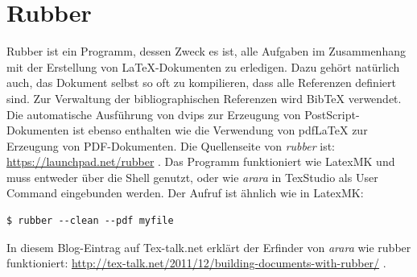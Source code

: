 \section{Rubber}
Rubber ist ein Programm, dessen Zweck es ist, alle Aufgaben im Zusammenhang mit der Erstellung von \LaTeX{}-Dokumenten zu erledigen. Dazu gehört natürlich auch, das Dokument selbst so oft zu kompilieren, dass alle Referenzen definiert sind. Zur Verwaltung der bibliographischen Referenzen wird BibTeX verwendet. Die automatische Ausführung von dvips zur Erzeugung von PostScript-Dokumenten ist ebenso enthalten wie die Verwendung von pdf\LaTeX{} zur Erzeugung von PDF-Dokumenten. Die Quellenseite von \emph{rubber} ist: \url{https://launchpad.net/rubber} . Das Programm funktioniert wie LatexMK und muss entweder über die Shell genutzt, oder wie \emph{arara} in TexStudio als User Command eingebunden werden. Der Aufruf ist ähnlich wie in LatexMK: 

\begin{lstlisting}[style=Bash]
$ rubber --clean --pdf myfile
\end{lstlisting}

In diesem Blog-Eintrag auf Tex-talk.net erklärt der Erfinder von \emph{arara} wie rubber funktioniert: \url{http://tex-talk.net/2011/12/building-documents-with-rubber/} .
